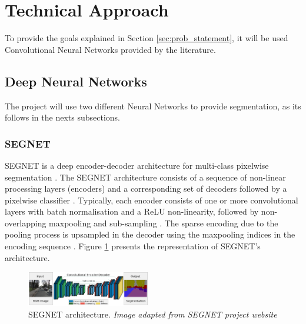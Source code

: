 \documentclass[10pt,twocolumn,letterpaper]{article}
\begin{document}
\section{Technical Approach} \label{sec:tech_approach}


To provide the goals explained in Section \ref{sec:prob_statement}, it  will be used Convolutional Neural Networks provided by the literature. 

\subsection{Deep Neural Networks} \label{ssec:neura_nets}

The project will use two different Neural Networks to provide segmentation, as its follows in the nexts subsections.

\subsubsection{SEGNET} \label{sssec:segnet}

SEGNET is a deep encoder-decoder architecture for multi-class pixelwise segmentation \cite{SEGNET}. The SEGNET architecture consists of a sequence of non-linear processing layers (encoders) and a corresponding set of decoders followed by a pixelwise classifier \cite{SEGNET} \cite{SEGNET_WEBSITE}. Typically, each encoder consists of one or more convolutional layers with batch normalisation and a ReLU non-linearity, followed by non-overlapping maxpooling and sub-sampling \cite{SEGNET} \cite{SEGNET_WEBSITE}. The sparse encoding due to the pooling process is upsampled in the decoder using the maxpooling indices in the encoding sequence \cite{SEGNET} \cite{SEGNET_WEBSITE}. Figure \ref{fig:segnet} presents the representation of SEGNET's architecture.

\begin{figure}[ht]
  \centering
  \includegraphics[width=0.48\textwidth]{segnet.png}
  \caption{SEGNET architecture. \textit{Image adapted from SEGNET project website} \cite{SEGNET_WEBSITE} \cite{SEGNET}}
  \label{fig:segnet}
\end{figure}
\end{document}
